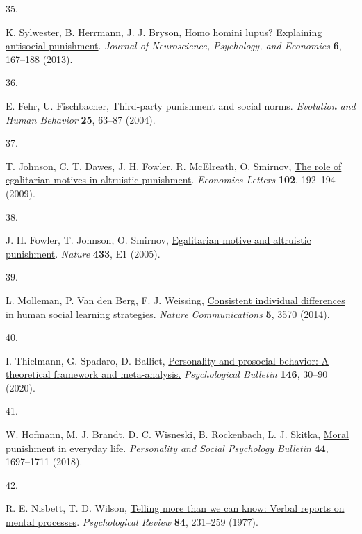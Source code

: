 \documentclass[
  man, donotrepeattitle,floatsintext]{apa6}
\newlength{\cslhangindent}
\newlength{\csllabelwidth}
\newlength{\cslentryspacingunit} %
\newenvironment{CSLReferences}[2] %
 {%
  \setlength{\parindent}{0pt}
  \ifodd #1
  \let\oldpar\par
  \def\par{\hangindent=\cslhangindent\oldpar}
  \fi
  \setlength{\parskip}{#2\cslentryspacingunit}
 }%
 {}
\newcommand{\CSLLeftMargin}[1]{\parbox[t]{\csllabelwidth}{#1}}
\newcommand{\CSLRightInline}[1]{\parbox[t]{\linewidth - \csllabelwidth}{#1}\break}
\begin{document}
\begin{CSLReferences}{0}{0}
\leavevmode{}%
\CSLLeftMargin{35. }%
\CSLRightInline{K. Sylwester, B. Herrmann, J. J. Bryson, \href{https://doi.org/10.1037/npe0000009}{Homo homini lupus? Explaining antisocial punishment}. \emph{Journal of Neuroscience, Psychology, and Economics} \textbf{6}, 167--188 (2013).}

\leavevmode{}%
\CSLLeftMargin{36. }%
\CSLRightInline{E. Fehr, U. Fischbacher, Third-party punishment and social norms. \emph{Evolution and Human Behavior} \textbf{25}, 63--87 (2004).}

\leavevmode{}%
\CSLLeftMargin{37. }%
\CSLRightInline{T. Johnson, C. T. Dawes, J. H. Fowler, R. McElreath, O. Smirnov, \href{https://doi.org/10.1016/j.econlet.2009.01.003}{The role of egalitarian motives in altruistic punishment}. \emph{Economics Letters} \textbf{102}, 192--194 (2009).}

\leavevmode{}%
\CSLLeftMargin{38. }%
\CSLRightInline{J. H. Fowler, T. Johnson, O. Smirnov, \href{https://doi.org/10.1038/nature03256}{Egalitarian motive and altruistic punishment}. \emph{Nature} \textbf{433}, E1 (2005).}

\leavevmode{}%
\CSLLeftMargin{39. }%
\CSLRightInline{L. Molleman, P. Van den Berg, F. J. Weissing, \href{https://doi.org/10.1038/ncomms4570}{Consistent individual differences in human social learning strategies}. \emph{Nature Communications} \textbf{5}, 3570 (2014).}

\leavevmode{}%
\CSLLeftMargin{40. }%
\CSLRightInline{I. Thielmann, G. Spadaro, D. Balliet, \href{https://doi.org/10.1037/bul0000217}{Personality and prosocial behavior: A theoretical framework and meta-analysis.} \emph{Psychological Bulletin} \textbf{146}, 30--90 (2020).}

\leavevmode{}%
\CSLLeftMargin{41. }%
\CSLRightInline{W. Hofmann, M. J. Brandt, D. C. Wisneski, B. Rockenbach, L. J. Skitka, \href{https://doi.org/10.1177/0146167218775075}{Moral punishment in everyday life}. \emph{Personality and Social Psychology Bulletin} \textbf{44}, 1697--1711 (2018).}

\leavevmode{}%
\CSLLeftMargin{42. }%
\CSLRightInline{R. E. Nisbett, T. D. Wilson, \href{https://doi.org/10.1037/0033-295X.84.3.231}{Telling more than we can know: Verbal reports on mental processes}. \emph{Psychological Review} \textbf{84}, 231--259 (1977).}


\end{CSLReferences}
\end{document}
